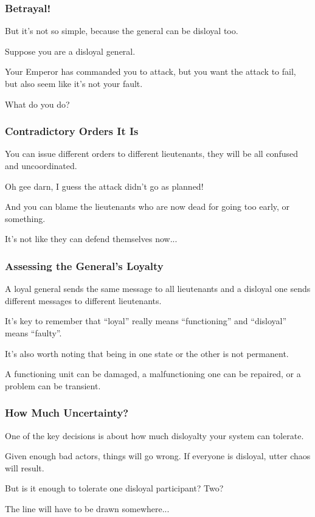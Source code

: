 \begin{frame}
\frametitle{Betrayal!}

But it's not so simple, because the general can be disloyal too. 

Suppose you are a disloyal general. 

Your Emperor has commanded you to attack, but you want the attack to fail, but also seem like it's not your fault. 

What do you do?

\end{frame}

\begin{frame}
\frametitle{Contradictory Orders It Is}

You can issue different orders to different lieutenants, they will be all confused and uncoordinated. 

Oh gee darn, I guess the attack didn't go as planned! 

And you can blame the lieutenants who are now dead for going too early, or something.

It's not like they can defend themselves now... 

\end{frame}

\begin{frame}
\frametitle{Assessing the General's Loyalty}

A loyal general sends the same message to all lieutenants and a disloyal one sends different messages to different lieutenants. 

It's key to remember that ``loyal'' really means ``functioning'' and ``disloyal'' means ``faulty''.

It's also worth noting that being in one state or the other is not permanent. 

A functioning unit can be damaged, a malfunctioning one can be repaired, or a problem can be transient.

\end{frame}

\begin{frame}
\frametitle{How Much Uncertainty?}

One of the key decisions is about how much disloyalty your system can tolerate. 

Given enough bad actors, things will go wrong. If everyone is disloyal, utter chaos will result. 

But is it enough to tolerate one disloyal participant? Two? 

The line will have to be drawn somewhere...

\end{frame}

